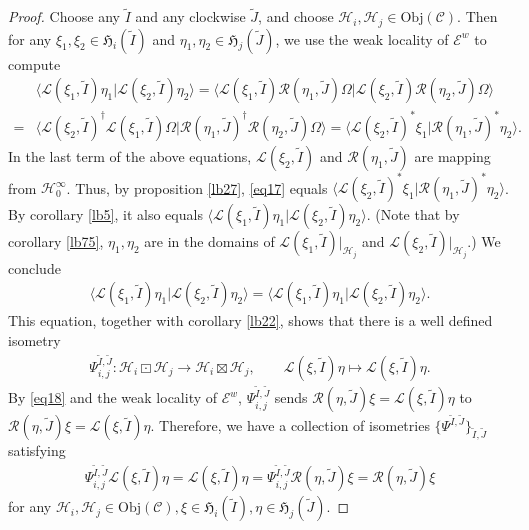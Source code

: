\documentclass[11pt,b5paper,notitlepage]{article}
\theoremstyle{definition}
\theoremstyle{plain}
\newcommand{\fk}{\mathfrak}
\newcommand{\mc}{\mathcal}
\newcommand{\wtd}{\widetilde}
\newcommand{\bk}[1]{\langle {#1}\rangle}
\newcommand{\scr}{\mathscr}
\newcommand{\Obj}{\mathrm{Obj}}
\numberwithin{equation}{subsection}
\begin{document}
\begin{proof}


Choose any $\wtd I$ and any clockwise $\wtd J$, and choose $\mc H_i,\mc H_j\in\Obj(\scr C)$. Then for any $\xi_1,\xi_2\in\fk H_i(\wtd I)$ and $\eta_1,\eta_2\in\fk H_j(\wtd J)$, we use the weak locality of $\scr E^w$ to compute
\begin{align}
&\bk{\mc L(\xi_1,\wtd I)\eta_1|\mc L(\xi_2,\wtd I)\eta_2}=\bk{\mc L(\xi_1,\wtd I)\mc R(\eta_1,\wtd J)\Omega|\mc L(\xi_2,\wtd I)\mc R(\eta_2,\wtd J)\Omega}\nonumber\\
=&\bk{\mc L(\xi_2,\wtd I)^\dagger\mc L(\xi_1,\wtd I)\Omega|\mc R(\eta_1,\wtd J)^\dagger\mc R(\eta_2,\wtd J)\Omega}=\bk{\mc L(\xi_2,\wtd I)^*\xi_1|\mc R(\eta_1,\wtd J)^*\eta_2}.\label{eq17}
\end{align}
In the last term of the above equations, $\mc L(\xi_2,\wtd I)$ and $\mc R(\eta_1,\wtd J)$ are mapping from $\mc H_0^\infty$. Thus, by proposition \ref{lb27},  \eqref{eq17} equals $\bk{\scr L(\xi_2,\wtd I)^*\xi_1|\scr R(\eta_1,\wtd J)^*\eta_2}$. By corollary \ref{lb5}, it also equals $\bk{\scr L(\xi_1,\wtd I)\eta_1|\scr L(\xi_2,\wtd I)\eta_2}$. (Note that by corollary \ref{lb75}, $\eta_1,\eta_2$ are in the domains of $\scr L(\xi_1,\wtd I)|_{\mc H_j}$ and $\scr L(\xi_2,\wtd I)|_{\mc H_j}$.) We conclude
\begin{align*}
\bk{\mc L(\xi_1,\wtd I)\eta_1|\mc L(\xi_2,\wtd I)\eta_2}=\bk{\scr L(\xi_1,\wtd I)\eta_1|\scr L(\xi_2,\wtd I)\eta_2}.
\end{align*}
This equation, together with corollary \ref{lb22}, shows that there is a well defined isometry
\begin{gather*}
\Psi_{i,j}^{\wtd I,\wtd J}:\mc H_i\boxdot\mc H_j\rightarrow\mc H_i\boxtimes\mc H_j,\qquad \mc L(\xi,\wtd I)\eta\mapsto\scr L(\xi,\wtd I)\eta.
\end{gather*}
By \eqref{eq18} and the weak locality of $\scr E^w$, $\Psi_{i,j}^{\wtd I,\wtd J}$ sends $\mc R(\eta,\wtd J)\xi=\mc L(\xi,\wtd I)\eta$ to $\scr R(\eta,\wtd J)\xi=\scr L(\xi,\wtd I)\eta$. Therefore, we have a collection of isometries $\{\Psi^{\wtd I,\wtd J}\}_{\wtd I,\wtd J}$ satisfying \begin{gather*}
\Psi_{i,j}^{\wtd I,\wtd J}\mc L(\xi,\wtd I)\eta=\scr L(\xi,\wtd I)\eta=\Psi_{i,j}^{\wtd I,\wtd J}\mc R(\eta,\wtd J)\xi=\scr R(\eta,\wtd J)\xi
\end{gather*}
for any $\mc H_i,\mc H_j\in\Obj(\scr C),\xi\in\fk H_i(\wtd I),\eta\in\fk H_j(\wtd J)$.


\end{proof}
\end{document}
